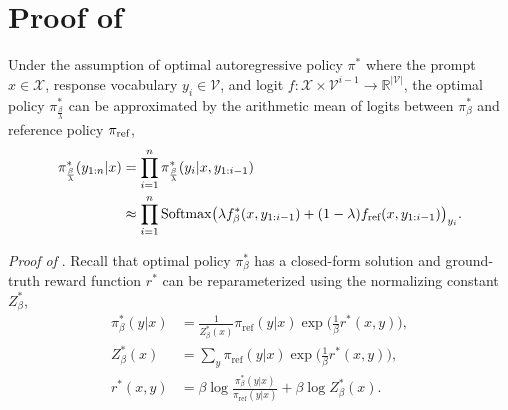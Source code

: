 \appendix
\onecolumn
\section{Proof of }\label{app:dera}

\begin{proposition*}
Under the assumption of optimal autoregressive policy $\pi^*$ where the prompt $x \in \mathcal{X}$, response vocabulary $y_i \in \mathcal{V}$, and logit $f: \mathcal{X} \times \mathcal{V}^{i-1} \rightarrow \mathbb{R}^{|\mathcal{V}|}$, the optimal policy $\pi^*_\frac{\beta}{\lambda}$ can be approximated by the arithmetic mean of logits between $\pi^*_\beta$ and reference policy $\pi_{\textnormal{ref}}$,
\begin{equation*}
\begin{split}
\pi^*_{\frac{\beta}{\lambda}} (y_{1:n}|x) &= \prod_{i=1}^n \pi^*_{\frac{\beta}{\lambda}} (y_i|x, y_{1:i-1}) \\
&\approx \prod_{i=1}^n \textnormal{Softmax} \big(\lambda f^*_\beta (x, y_{1:i-1}) + (1 - \lambda) f_{\textnormal{ref}} (x, y_{1:i-1}) \big)_{y_i}. \\
\end{split}
\end{equation*}
\end{proposition*}

\textit{Proof of }. Recall that optimal policy $\pi^*_\beta$ has a closed-form solution and ground-truth reward function $r^*$ can be reparameterized using the normalizing constant $Z^*_\beta$,
\begin{equation*}
\begin{split}
\pi^*_\beta (y | x) &= \frac{1}{Z^*_\beta(x)}\pi_{\text{ref}}(y | x) \exp \big(\frac{1}{\beta}r^*(x, y)\big), \\
Z^*_\beta(x) &= \sum_{y} \pi_{\text{ref}}(y | x) \exp \big(\frac{1}{\beta}r^*(x, y)\big), \\
r^*(x, y) &= \beta \log \frac{\pi^*_\beta (y | x)}{\pi_{\text{ref}}(y | x) } + \beta \log Z^*_\beta(x). \\
\end{split}
\end{equation*}

